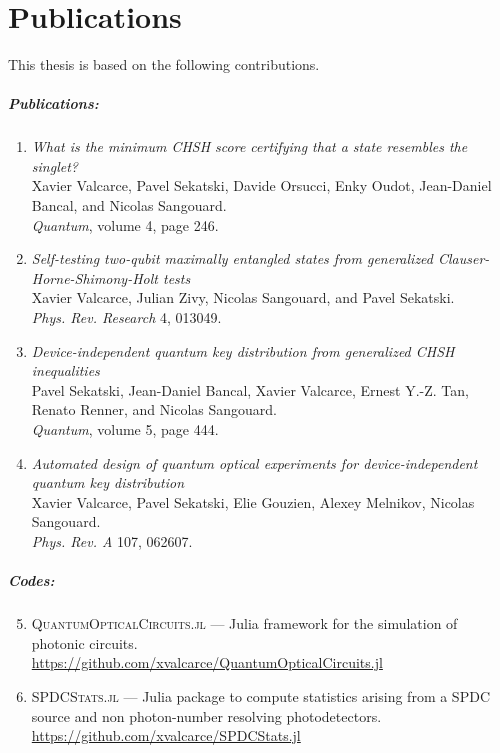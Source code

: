 \chapter{Publications}

This thesis is based on the following contributions.

\paragraph{Publications:}
\begin{enumerate}
	\item 
		\textit{What is the minimum CHSH score certifying that a state resembles the singlet?} \\
		Xavier Valcarce, Pavel Sekatski, Davide Orsucci, Enky Oudot, Jean-Daniel Bancal, and Nicolas Sangouard. \\
		\textit{Quantum}, volume 4, page 246.
	\item 
		\textit{Self-testing two-qubit maximally entangled states from generalized Clauser-Horne-Shimony-Holt tests} \\
		Xavier Valcarce, Julian Zivy, Nicolas Sangouard, and Pavel Sekatski. \\
		\textit{Phys. Rev. Research} 4, 013049.
	\item
		\textit{Device-independent quantum key distribution from generalized CHSH inequalities} \\
		Pavel Sekatski, Jean-Daniel Bancal, Xavier Valcarce, Ernest Y.-Z. Tan, Renato Renner, and Nicolas Sangouard. \\
		\textit{Quantum}, volume 5, page 444.
	\item 
		\textit{Automated design of quantum optical experiments for device-independent quantum key distribution}  \\
		Xavier Valcarce, Pavel Sekatski, Elie Gouzien, Alexey Melnikov, Nicolas Sangouard. \\
		\textit{Phys. Rev. A} 107, 062607.
\end{enumerate}

\paragraph{Codes:}
\begin{enumerate}
	\setcounter{enumi}{4}
	\item \textsc{QuantumOpticalCircuits.jl} --- Julia framework for the simulation of photonic circuits. \\
		\url{https://github.com/xvalcarce/QuantumOpticalCircuits.jl}
	\item \textsc{SPDCStats.jl} --- Julia package to compute statistics arising from a SPDC source and non photon-number resolving photodetectors. \\
		\url{https://github.com/xvalcarce/SPDCStats.jl}
\end{enumerate}
